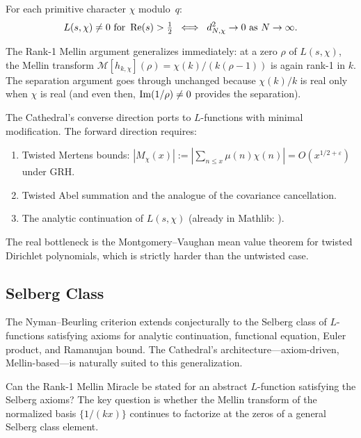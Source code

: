 \documentclass[11pt,a4paper]{article}
\begin{document}
\begin{conjecture}
For each primitive character $\chi$ modulo~$q$:
\[
  L(s,\chi) \neq 0 \text{ for } \operatorname{Re}(s) > \tfrac{1}{2}
  \;\iff\;
  d_{N,\chi}^2 \to 0 \text{ as } N \to \infty.
\]
\end{conjecture}

The Rank-1 Mellin argument generalizes immediately: at a zero $\rho$ of
$L(s,\chi)$, the Mellin transform $\mathcal{M}[h_{k,\chi}](\rho) =
\chi(k)/(k(\rho-1))$ is again rank-1 in $k$. The separation argument
goes through unchanged because $\chi(k)/k$ is real only when $\chi$ is
real (and even then, $\operatorname{Im}(1/\rho) \neq 0$ provides the separation).

\begin{direction}
The Cathedral's converse direction ports to $L$-functions with minimal
modification. The forward direction requires:
\begin{enumerate}
  \item Twisted Mertens bounds: $|M_\chi(x)| := |\sum_{n \le x} \mu(n)\chi(n)|
    = O(x^{1/2+\varepsilon})$ under GRH.
  \item Twisted Abel summation and the analogue of the covariance cancellation.
  \item The analytic continuation of $L(s,\chi)$ (already in Mathlib:
    ).
\end{enumerate}
The real bottleneck is the Montgomery--Vaughan mean value theorem for
twisted Dirichlet polynomials, which is strictly harder than the
untwisted case.
\end{direction}

\subsection{Selberg Class}

The Nyman--Beurling criterion extends conjecturally to the Selberg class
of $L$-functions satisfying axioms for analytic continuation, functional
equation, Euler product, and Ramanujan bound. The Cathedral's
architecture---axiom-driven, Mellin-based---is naturally suited to this
generalization.

\begin{open}
Can the Rank-1 Mellin Miracle be stated for an abstract $L$-function
satisfying the Selberg axioms? The key question is whether the Mellin
transform of the normalized basis $\{1/(kx)\}$ continues to factorize
at the zeros of a general Selberg class element.
\end{open}
\end{document}
